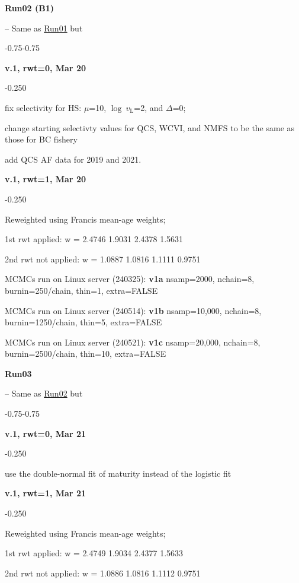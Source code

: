 \hypertarget{R02}{\textbf{Run02 (B1)}} -- Same as \hyperlink{R01}{Run01} but
\begin{itemize_csas}{-0.75}{-0.75}
	\item \textbf{v.1, rwt=0, Mar 20}
	\begin{itemize_csas}{-0.25}{0}
		\item fix selectivity for HS: $\mu$=10, $\log~v_\text{L}$=2, and $\Delta$=0;
		\item change starting selectivty values for QCS, WCVI, and NMFS to be the same as those for BC fishery
		\item add QCS AF data for 2019 and 2021.
	\end{itemize_csas}
	\item \textbf{v.1, rwt=1, Mar 20}
	\begin{itemize_csas}{-0.25}{0}
		\item Reweighted using Francis mean-age weights;
		\item 1st rwt applied: w =  2.4746 1.9031 2.4378 1.5631
		\item 2nd rwt not applied: w = 1.0887 1.0816 1.1111 0.9751
		\item MCMCs run on Linux server (240325): \textbf{v1a} nsamp=2000, nchain=8, burnin=250/chain, thin=1, extra=FALSE
		\item MCMCs run on Linux server (240514): \textbf{v1b} nsamp=10,000, nchain=8, burnin=1250/chain, thin=5, extra=FALSE
		\item MCMCs run on Linux server (240521): \textbf{v1c} nsamp=20,000, nchain=8, burnin=2500/chain, thin=10, extra=FALSE
	\end{itemize_csas}
\end{itemize_csas}

\hypertarget{R03}{\textbf{Run03}} -- Same as \hyperlink{R02}{Run02} but
\begin{itemize_csas}{-0.75}{-0.75}
	\item \textbf{v.1, rwt=0, Mar 21}
	\begin{itemize_csas}{-0.25}{0}
		\item use the double-normal fit of maturity instead of the logistic fit
	\end{itemize_csas}
	\item \textbf{v.1, rwt=1, Mar 21}
	\begin{itemize_csas}{-0.25}{0}
		\item Reweighted using Francis mean-age weights;
		\item 1st rwt applied: w =  2.4749 1.9034 2.4377 1.5633
		\item 2nd rwt not applied: w = 1.0886 1.0816 1.1112 0.9751
	\end{itemize_csas}
\end{itemize_csas}

